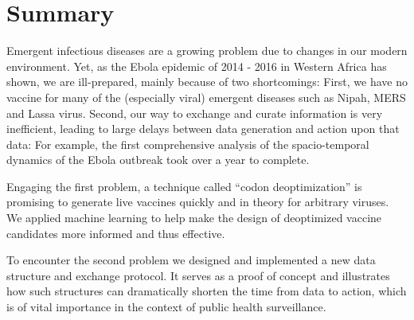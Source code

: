 \section{Summary}

Emergent infectious diseases are a growing problem due to changes in our modern environment. Yet, as the Ebola epidemic of 2014 - 2016 in Western Africa has shown, we are ill-prepared, mainly because of two shortcomings: First, we have no vaccine for many of the (especially viral) emergent diseases such as Nipah, MERS and Lassa virus. Second, our way to exchange and curate information is very inefficient, leading to large delays between data generation and action upon that data: For example, the first comprehensive analysis of the spacio-temporal dynamics of the Ebola outbreak took over a year to complete.

Engaging the first problem, a technique called ``codon deoptimization'' is promising to generate live vaccines quickly and in theory for arbitrary viruses. We applied machine learning to help make the design of deoptimized vaccine candidates more informed and thus effective.

To encounter the second problem we designed and implemented a new data structure and exchange protocol. It serves as a proof of concept and illustrates how such structures can dramatically shorten the time from data to action, which is of vital importance in the context of public health surveillance.
